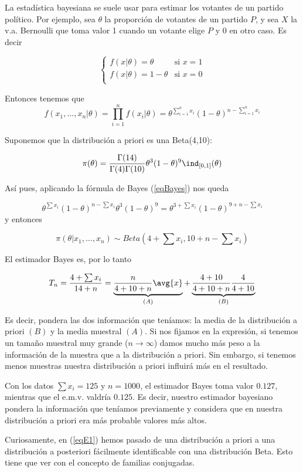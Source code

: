 \documentclass{apuntes}
\begin{document}
La estadística bayesiana se suele usar para estimar los votantes de un partido político. Por ejemplo, sea $\theta$ la proporción de votantes de un partido $P$, y sea $X$ la v.a. Bernoulli que toma valor 1 cuando un votante elige $P$ y 0 en otro caso. Es decir

\[ \begin{cases}
f(x|\theta) = \theta &\text{si } x=1 \\
f(x|\theta) = 1 - \theta &\text{si } x=0 \\
\end{cases} \]

Entonces tenemos que \[ f(x_1,\dotsc,x_n|\theta) = \prod_{i=1}^n f(x_i|\theta) = \theta^{\sum_{i=1}^n x_i} (1-\theta)^{n -\sum_{i=1}^n x_i} \]

Suponemos que la distribución a priori es una Beta(4,10):

\[ \pi(\theta) = \frac{\Gamma(14)}{\Gamma(4)\Gamma(10)}\theta^3(1-\theta)^9\ind_{[0,1]}(\theta) \]

Así pues, aplicando la fórmula de Bayes (\ref{eqBayes}) nos queda

\begin{equation}\label{eqE1}
\theta^{\sum x_i}(1-\theta)^{n-\sum x_i} \theta^3 (1-\theta)^9 = \theta^{3+\sum x_i} (1-\theta)^{ 9 + n - \sum x_i}
\end{equation} y entonces

\[  \pi(\theta | x_1,\dotsc,x_n)  \sim Beta(4 + \sum x_i, 10 + n - \sum x_i) \]

El estimador Bayes es, por lo tanto

\[ T_n = \frac{4 + \sum x_i}{14 + n} = \underbrace{\frac{n}{4 + 10 + n}\avg{x}}_{(A)} + \underbrace{\frac{4+10}{4+10+n}\frac{4}{4+10}}_{(B)} \]

Es decir, pondera las dos información que teníamos: la media de la distribución a priori $(B)$ y la media muestral $(A)$. Si nos fijamos en la expresión, si tenemos un tamaño muestral muy grande ($n\to\infty$) damos mucho más peso a la información de la muestra que a la distribución a priori. Sin embargo, si tenemos menos muestras nuestra distribución a priori influirá más en el resultado.

Con los datos $\sum x_i = 125$ y $n = 1000$, el estimador Bayes toma valor $0.127$, mientras que el e.m.v. valdría $0.125$. Es decir, nuestro estimador bayesiano pondera la información que teníamos previamente y considera que en nuestra distribución a priori era más probable valores más altos.

Curiosamente, en (\ref{eqE1}) hemos pasado de una distribución a priori a una distribución a posteriori fácilmente identificable con una distribución Beta. Esto tiene que ver con el concepto de familias conjugadas.
\end{document}
